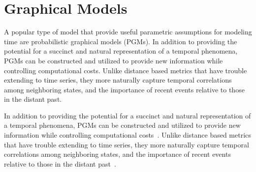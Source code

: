 \section{Graphical Models}
A popular type of model that provide useful parametric assumptions for modeling time are probabilistic graphical models (PGMs).  In addition to providing the potential for a succinct and natural representation of a temporal phenomena, PGMs can be constructed and utilized to provide new information while controlling computational costs. Unlike distance based metrics that have trouble extending to time series, they more naturally capture temporal correlations among neighboring states, and the importance of recent events relative to those in the distant past.

In addition to providing the potential for a succinct and natural representation of a temporal phenomena, PGMs can be constructed and utilized to provide new information while controlling computational costs~\cite{Jordan03gm}. Unlike distance based metrics that have trouble extending to time series, they more naturally capture temporal correlations among neighboring states, and the importance of recent events relative to those in the distant past~\cite{Fruhwirth-Schnatter11,hoppner:time,Jebara_07,koller}.



